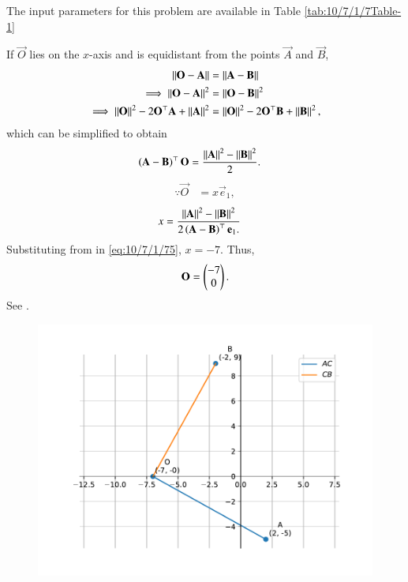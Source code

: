		The input parameters for this problem are available in Table \ref{tab:10/7/1/7Table-1}
\begin{table}[H]

\caption{}
\label{tab:10/7/1/7Table-1}	
\end{table}
%
  If $\vec{O}$ lies on the  $x$-axis and is  equidistant from the points $\vec{A}$ and $\vec{B}$, 
\begin{align}
 \left\lVert\mathbf{O}-\mathbf{A}\right\rVert &=
\left\lVert\mathbf{A}-\mathbf{B}\right\rVert 
\\
 \implies \left\lVert\mathbf{O}-\mathbf{A}\right\rVert^2 &=
\left\lVert\mathbf{O}-\mathbf{B}\right\rVert^2 
\\
 \implies \left\lVert\mathbf{O}\right\rVert^2-2{\mathbf{O}}^{\top}\mathbf{A} + \left\lVert\mathbf{A}\right\rVert^2
	&= \left\lVert\mathbf{O}\right\rVert^2-2{\mathbf{O}}^{\top}\mathbf{B} + \left\lVert\mathbf{B}\right\rVert^2,
\end{align}
which can be simplified to obtain
  \begin{align}
	  \left(\mathbf{A}-\mathbf{B}\right)^\top   \mathbf{O}&=\frac{\left\lVert\mathbf{A}\right\rVert^2 -\left\lVert\mathbf{B}\right\rVert^2 }{2}.
  \end{align}
  \begin{align}
  \because
   \vec{O} &=
    x\vec{e}_1,
  \end{align}
  \begin{align}
   x &=\frac{\left\lVert\mathbf{A}\right\rVert^2 -\left\lVert\mathbf{B}\right\rVert^2 }{2\left(\mathbf{A}-\mathbf{B}\right)^{\top }\mathbf{e}_1.
}\label{eq:10/7/1/75}  
  \end{align}
  Substituting from  in \eqref{eq:10/7/1/75},
 $x =  -7$.  Thus, 
		\begin{align}
\mathbf{O} = \begin{pmatrix} -7 \\ 0\end{pmatrix}.
		\end{align}
		See  
.
\begin{figure}[H]
 \begin{center}
  \includegraphics[width=0.75\columnwidth]{chapters/10/7/1/7/figs/fig.pdf}
 \end{center}
\caption{}
\label{fig:10/7/1/7Fig1}
\end{figure}

